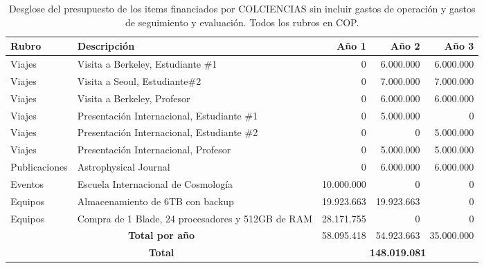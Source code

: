 \begin{table}[!h]
\begin{center}
\begin{tabular}{|l|p{5.5cm}|r|r|r|}\hline
{\bf Rubro}	&{\bf Descripción}	& {\bf Año 1}	& {\bf Año 2}	& {\bf Año 3}\\\hline
Viajes	&Visita a Berkeley, Estudiante \#1	&0	&6.000.000	&6.000.000\\\hline
Viajes	&Visita a Seoul,  Estudiante\#2	&0	&7.000.000	&7.000.000\\\hline
Viajes	&Visita a Berkeley, Profesor	&0	&6.000.000	&6.000.000\\\hline
Viajes	&Presentación Internacional, Estudiante \#1	&0	&5.000.000	&0\\\hline
Viajes	&Presentación Internacional, Estudiante \#2	&0	&0	&5.000.000\\\hline
Viajes	&Presentación Internacional, Profesor	&0	&5.000.000	&5.000.000\\\hline
Publicaciones	&Astrophysical Journal	&0	&6.000.000	&6.000.000\\\hline
Eventos	&Escuela Internacional de Cosmología	&10.000.000	&0	&0\\\hline
Equipos	&Almacenamiento de 6TB con backup 	&19.923.663	&19.923.663	&0\\\hline
Equipos	&Compra de 1 Blade, 24 procesadores y 512GB de RAM 	&28.171.755	&0	&0\\\hline
\multicolumn{2}{|c|}{{\bf Total por año}}	 & 58.095.418	&54.923.663	&35.000.000 \\\hline
\multicolumn{2}{|c|}{\bf Total } & \multicolumn{3}{|c|}{{\bf 148.019.081}}\\\hline
\end{tabular} 
\caption{Desglose del presupuesto de los items financiados por COLCIENCIAS sin incluir gastos de operaci\'on y gastos de seguimiento y evaluaci\'on. Todos los rubros en COP.}
\end{center}
\label{Resumen Presupuesto Colciencias}
\end{table}


